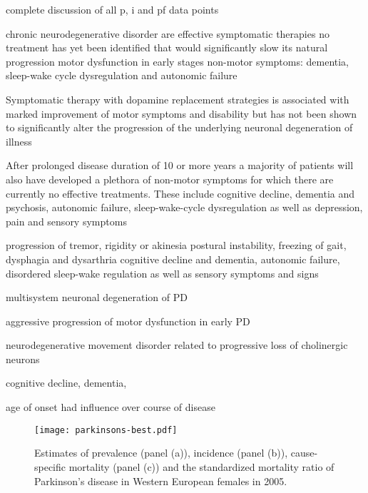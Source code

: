 complete discussion of all p, i and pf data points

chronic neurodegenerative disorder
are effective symptomatic therapies
no treatment has yet been identified that would significantly slow its natural progression
motor dysfunction in early stages
non-motor symptoms: dementia, sleep-wake cycle dysregulation and autonomic failure

Symptomatic therapy with dopamine replacement strategies is associated with marked improvement of motor symptoms and disability but has not been shown to significantly alter
the progression of the underlying neuronal degeneration of illness

After prolonged disease duration of 10 or more years a majority of patients will
also have developed a plethora of non-motor symptoms for which there are currently no effective treatments. These include cognitive decline, dementia and psychosis, autonomic failure, sleep-wake-cycle dysregulation as well as depression, pain and sensory symptoms

progression of tremor, rigidity or akinesia
postural instability, freezing of gait, dysphagia and dysarthria
cognitive decline and dementia, autonomic failure, disordered sleep-wake regulation as
well as sensory symptoms and signs

multisystem neuronal degeneration of PD

aggressive progression of motor dysfunction in early PD

neurodegenerative movement disorder related to progressive loss of cholinergic neurons

cognitive decline, dementia,

\cite{poewe_natural_2006}

age of onset had influence over course of disease

    \begin{figure}[h]
        \begin{center}
            \texttt{[image: parkinsons-best.pdf]}
            \caption{Estimates of prevalence (panel (a)), incidence (panel (b)), cause-specific mortality (panel (c)) and the standardized mortality ratio of Parkinson's disease in Western European females in 2005.}
            \label{fig:intro-parkinsons fit}
        \end{center}
    \end{figure} 